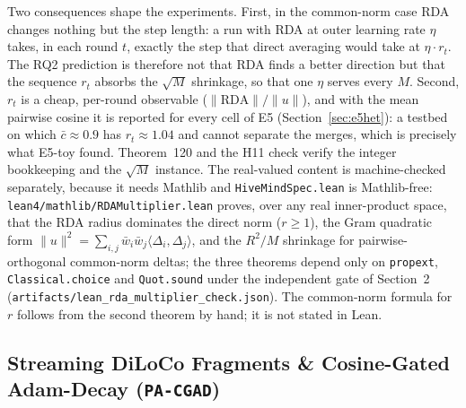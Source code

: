 \documentclass[11pt,a4paper]{article}
\begin{document}
Two consequences shape the experiments. First, in the common-norm case RDA changes nothing but the step length: a run with RDA at outer learning rate $\eta$ takes, in each round $t$, exactly the step that direct averaging would take at $\eta \cdot r_t$. The RQ2 prediction is therefore not that RDA finds a better direction but that the sequence $r_t$ absorbs the $\sqrt{M}$ shrinkage, so that one $\eta$ serves every $M$. Second, $r_t$ is a cheap, per-round observable ($\|\mathrm{RDA}\|/\|u\|$), and with the mean pairwise cosine it is reported for every cell of E5 (Section~\ref{sec:e5het}): a testbed on which $\bar c \approx 0.9$ has $r_t \approx 1.04$ and cannot separate the merges, which is precisely what E5-toy found. Theorem~120 and the H11 check verify the integer bookkeeping and the $\sqrt{M}$ instance. The real-valued content is machine-checked separately, because it needs Mathlib and \texttt{HiveMindSpec.lean} is Mathlib-free: \texttt{lean4/mathlib/RDAMultiplier.lean} proves, over any real inner-product space, that the RDA radius dominates the direct norm ($r \ge 1$), the Gram quadratic form $\|u\|^2 = \sum_{i,j}\bar w_i \bar w_j\langle\Delta_i,\Delta_j\rangle$, and the $R^2/M$ shrinkage for pairwise-orthogonal common-norm deltas; the three theorems depend only on \texttt{propext}, \texttt{Classical.choice} and \texttt{Quot.sound} under the independent gate of Section~2 (\texttt{artifacts/lean\_rda\_multiplier\_check.json}). The common-norm formula for $r$ follows from the second theorem by hand; it is not stated in Lean.

\subsection{Streaming DiLoCo Fragments \& Cosine-Gated Adam-Decay (\texttt{PA-CGAD})}
\end{document}
